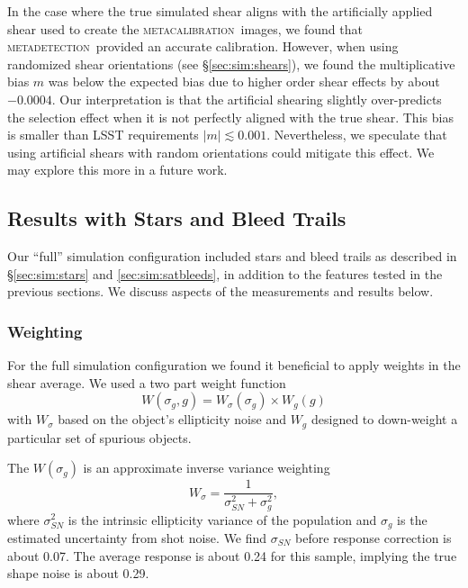 \documentclass[twocolumn,twocolappendix,astrosym]{openjournal}
\newcommand{\mcal}{\textsc{metacalibration}}
\newcommand{\mdet}{\textsc{metadetection}}
\begin{document}
In the case where the true simulated shear aligns with the artificially applied
shear used to create the \mcal\ images, we found that \mdet\ provided an
accurate calibration.  However, when using randomized shear orientations (see
\S \ref{sec:sim:shears}), we found the multiplicative bias $m$ was below the
expected bias due to higher order shear effects by about $-0.0004$.  Our
interpretation is that the artificial shearing slightly over-predicts the
selection effect when it is not perfectly aligned with the true shear.  This
bias is smaller than LSST requirements $|m| \lesssim 0.001$.  Nevertheless, we
speculate that using artificial shears with random orientations could mitigate
this effect.  We may explore this more in a future work.

\subsection{Results with Stars and Bleed Trails} \label{sec:results:full}

Our ``full'' simulation configuration included stars and bleed trails as
described in \S \ref{sec:sim:stars} and \ref{sec:sim:satbleeds}, in addition to
the features tested in the previous sections.  We discuss aspects of the
measurements and results below.

\subsubsection{Weighting}

For the full simulation configuration we found it beneficial to apply weights
in the shear average.  We used a two part weight function
\begin{equation}
    W(\sigma_g, g) = W_\sigma (\sigma_g) \times W_g(g)
\end{equation}
with $W_\sigma$ based on the object's ellipticity noise and $W_g$ designed to
down-weight a particular set of spurious objects.

The $W(\sigma_g)$ is an approximate inverse variance weighting
\begin{equation}
    W_\sigma = \frac{1}{\sigma_{SN}^2 + \sigma_g^2},
\end{equation}
where $\sigma^2_{SN}$ is the intrinsic ellipticity variance of the population
and $\sigma_g$ is the estimated uncertainty from shot noise.  We find
$\sigma_{SN}$ before response correction is about 0.07.  The average response
is about 0.24 for this sample, implying the true shape noise is about 0.29.
\end{document}
